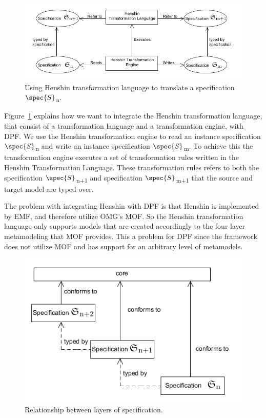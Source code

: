 \begin{figure}[H]
	\centering
	\includegraphics[scale=0.7]{./Figures/TransformationSolutionBasic.png}
	\caption[Integrating Henshin with DPF]
	{Using Henshin transformation language to translate a specification
	$\spec{S}$\textsubscript{n}.}
	\label{fig:Simple_Solution}
\end{figure}

Figure~\ref{fig:Simple_Solution} explains how we want to integrate the Henshin
transformation language, that consist of a transformation language and a
transformation engine, with DPF. We use the Henshin transformation engine to
read an instance specification $\spec{S}$\textsubscript{n} and write an instance
specification $\spec{S}$\textsubscript{m}. To achieve this the transformation
engine executes a set of transformation rules written in the Henshin
Transformation Language. These transformation rules refers to both the
specification $\spec{S}$\textsubscript{n+1} and specification
$\spec{S}$\textsubscript{m+1} that the source and target model are typed over.

The problem with integrating Henshin with DPF is that Henshin is implemented by
EMF, and therefore utilize OMG's MOF. So the Henshin transformation language
only supports models that are created accordingly to the four layer metamodeling
that MOF provides. This a problem for DPF since the framework does not
utilize MOF and has support for an arbitrary level of metamodels.  

\begin{figure}[H]
	\centering
	\includegraphics[scale=0.7]{./Figures/metamodelSpecification.png}
	\caption[Specification relationship with core metamodel]
	{Relationship between layers of specification.}
	\label{fig:core_metamodel}
\end{figure}

